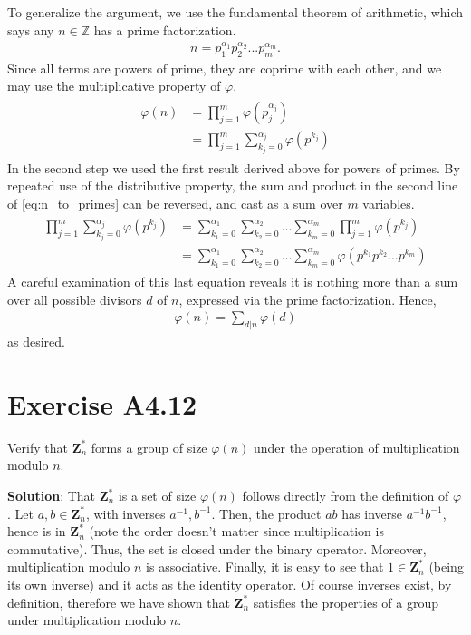 \documentclass{book}
\begin{document}
    To generalize the argument, we use the fundamental theorem of arithmetic, which says any $n\in \mathbb{Z}$ has a prime factorization.
    \begin{align}
        n = p_1^{\alpha_1}p_2^{\alpha_2}...p_m^{\alpha_m}.
    \end{align}
    Since all terms are powers of prime, they are coprime with each other, and we may use the multiplicative property of $\varphi$.
    \begin{align} \label{eq:n_to_primes}
    \begin{aligned}
        \varphi(n) &= \prod_{j=1}^{m}\varphi(p_j^{\alpha_j}) \\
        &= \prod_{j=1}^m \sum_{k_j=0}^{\alpha_j}\varphi(p^{k_j})
    \end{aligned}
    \end{align}
    In the second step we used the first result derived above for powers of primes. By repeated use of the distributive property, the sum and product in the second line of \eqref{eq:n_to_primes} can be reversed, and cast as a sum over $m$ variables.
    \begin{align}
    \begin{aligned}
        \prod_{j=1}^m \sum_{k_j=0}^{\alpha_j}\varphi(p^{k_j}) &= \sum_{k_1=0}^{\alpha_1}\sum_{k_2=0}^{\alpha_2} \dots \sum_{k_m=0}^{\alpha_m} \prod_{j=1}^m \varphi(p^{k_j}) \\
        &= \sum_{k_1=0}^{\alpha_1}\sum_{k_2=0}^{\alpha_2} \dots \sum_{k_m=0}^{\alpha_m} \varphi(p^{k_1}p^{k_2}...p^{k_m})
    \end{aligned}
    \end{align}
    A careful examination of this last equation reveals it is nothing more than a sum over all possible divisors $d$ of $n$, expressed via the prime factorization. Hence,
    \begin{align}
        \varphi(n) = \sum_{d|n} \varphi(d)
    \end{align}
    as desired.

\section*{Exercise A4.12}
    Verify that $\textbf{Z}_n^*$ forms a group of size $\varphi(n)$ under the operation of multiplication modulo $n$.
    
    \textbf{Solution}: That $\textbf{Z}_n^*$ is a set of size $\varphi(n)$ follows directly from the definition of $\varphi$. Let $a,b \in \textbf{Z}_n^*$, with inverses $a^{-1}, b^{-1}$. Then, the product $ab$ has inverse $a^{-1}b^{-1}$, hence is in $\textbf{Z}_n^*$ (note the order doesn't matter since multiplication is commutative). Thus, the set is closed under the binary operator. Moreover, multiplication modulo $n$ is associative. Finally, it is easy to see that $1\in \textbf{Z}_n^*$ (being its own inverse) and it acts as the identity operator. Of course inverses exist, by definition, therefore we have shown that $\textbf{Z}_n^*$ satisfies the properties of a group under multiplication modulo $n$.
\end{document}
